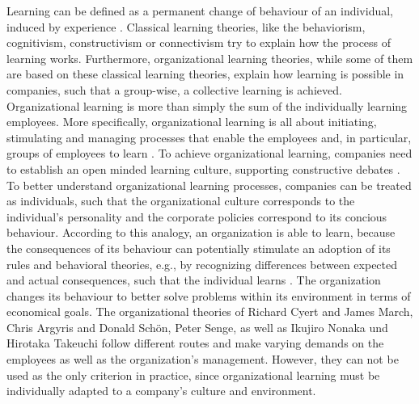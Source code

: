 \documentclass[12pt]{article}
\begin{document}
Learning can be defined as a permanent change of behaviour of an individual,
induced by experience \cite{Lefrancois:2006}. Classical learning theories, like
the behaviorism, cognitivism, constructivism or connectivism try to explain how
the process of learning works. Furthermore, organizational learning theories,
while some of them are based on these classical learning theories, explain how
learning is possible in companies, such that a group-wise, a collective
learning is achieved. Organizational learning is more than simply the sum of
the individually learning employees. More specifically, organizational learning
is all about initiating, stimulating and managing processes that enable the
employees and, in particular, groups of employees to learn \cite{Franken:2002}.
To achieve organizational learning, companies need to establish an open minded
learning culture, supporting constructive debates \cite{culture}.
To better understand organizational learning processes, companies can be
treated as individuals, such that the organizational culture corresponds to the
individual's personality and the corporate policies correspond to its concious
behaviour. According to this analogy, an organization is able to learn, because
the consequences of its behaviour can potentially stimulate an adoption of its
rules and behavioral theories, e.g., by recognizing differences between
expected and actual consequences, such that the individual learns
\cite{Pawlowsky:1992}. The organization changes its behaviour to better solve
problems within its environment in terms of economical goals. The
organizational theories of Richard Cyert and James March, Chris Argyris and
Donald Schön, Peter Senge, as well as Ikujiro Nonaka und Hirotaka Takeuchi
follow different routes and make varying demands on the employees as well as
the organization's management. However, they can not be used as the only
criterion in practice, since organizational learning must be individually
adapted to a company's culture and environment.
\end{document}
